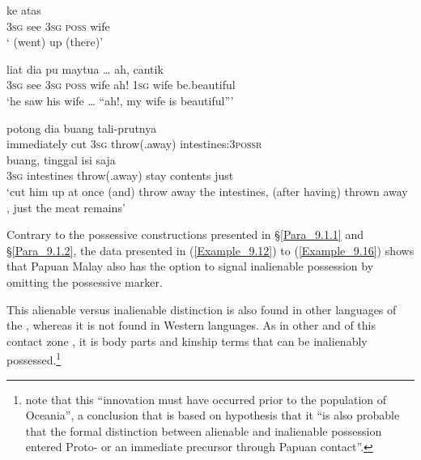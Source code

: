 \ea
\label{Example_9.14}
 {} {} {} {ke} {atas}\\ %
 \textsc{3sg} { }   see  \textsc{3sg}  \textsc{poss}  wife\\
\glt 
‘ (went) up (there)’ \textstyleExampleSource{[080923-001-CvNP.0019]}
\z

\ea
\label{Example_9.15}
 {liat} {dia} {pu} {maytua} {\ldots} {ah,} {} {} {} {cantik}\\ %
 \textsc{3sg}  see  \textsc{3sg}  \textsc{poss}  wife { }   ah!  \textsc{1sg} { }   wife  be.beautiful\\
\glt 
‘he saw his wife {\ldots} ``ah!, my wife is beautiful''' \textstyleExampleSource{[080922-010a-CvNF.0020]}
\z

\ea
\label{Example_9.16}
 {{potong}} {dia} {{buang}} {{tali-prutnya}}\\ %
 {immediately}  {cut}  \textsc{3sg}  {throw(.away)}  {intestines:\textsc{3possr}}\\
\gll {}    {}  {buang,}  {tinggal}  isi  saja\\
 \textsc{3sg}  { }  {intestines}  {throw(.away)}  {stay}  contents  just\\
 ‘cut him up at once (and) throw away the intestines, (after having) thrown away , just the meat remains’ \textstyleExampleSource{[081106-001-CvPr.0005]}
\z



Contrary to the possessive constructions presented in §\ref{Para_9.1.1} and §\ref{Para_9.1.2}, the data presented in (\ref{Example_9.12}) to (\ref{Example_9.16}) shows that Papuan Malay also has the option to signal inalienable possession by omitting the possessive marker.



This alienable versus inalienable distinction is also found in other  languages of the , whereas it is not found in Western  languages. As in other  and  of this contact zone \citep[116]{Klamer.2008}, it is body parts and kinship terms that can be inalienably possessed.\footnote{\citet[116]{Klamer.2008} note that this “innovation must have occurred prior to the population of Oceania”, a conclusion that is based on  hypothesis that it “is also probable that the formal distinction between alienable and inalienable possession entered Proto- or an immediate precursor through Papuan contact”.}


